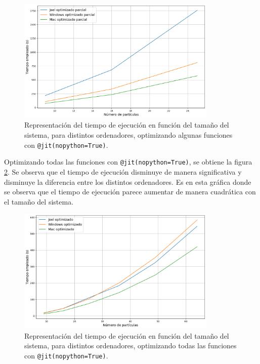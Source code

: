\documentclass[11pt, twoside]{article} %
\begin{document}
\begin{figure}[h!]
    \centering
    \includegraphics[width=0.85\textwidth]{plots/optimizado_parcial.png}
    \caption{Representación del tiempo de ejecución en función del tamaño del sistema, 
    para distintos ordenadores, optimizando algunas funciones con \texttt{@jit(nopython=True)}.}
    \label{fig:optimizado_parcial}
\end{figure}

Optimizando todas las funciones con \texttt{@jit(nopython=True)}, se obtiene la figura
\ref{fig:optimizado}. Se observa que el tiempo de ejecución disminuye de manera significativa
y disminuye la diferencia entre los distintos ordenadores. Es en esta gráfica donde se
observa que el tiempo de ejecución parece aumentar de manera cuadrática con el 
tamaño del sistema.

\begin{figure}[h!]
    \centering
    \includegraphics[width=0.85\textwidth]{plots/optimizado.png}
    \caption{Representación del tiempo de ejecución en función del tamaño del sistema, 
    para distintos ordenadores, optimizando todas las funciones con \texttt{@jit(nopython=True)}.}
    \label{fig:optimizado}
\end{figure}
\end{document}

